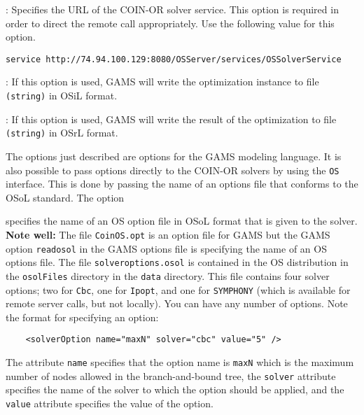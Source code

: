 \vskip 8pt
: Specifies the URL of  the COIN-OR solver service. 
This option is required in order to direct the remote call appropriately.
\vskip 8pt
Use the following value for this option.
\begin{verbatim}
service http://74.94.100.129:8080/OSServer/services/OSSolverService
\end{verbatim}


\iffalse
\vskip 8pt
\noindent {\tt solver  (string)}:   Specifies the solver that is used to solve an instance. 
Valid values are {\tt clp},  {\tt cbc}, {\tt glpk}, {\tt ipopt},  and {\tt bonmin}.  
If a solver name is specified that is not recognized, the default solver for the problem type is used.  
The value for the solver option is case insensitive. 
For example, if the file {\tt CoinOS.opt} contains the two lines
\begin{verbatim}
service http://74.94.100.129:8080/OSServer/services/OSSolverService
solver glpk
\end{verbatim}
then executing
\begin{verbatim}
gams.exe eastborne.gms optfile 1
\end{verbatim}
will result in  using {\tt Glpk}  to solve the problem.   
\fi

\vskip 8pt
:  If this option is used, GAMS will write the optimization instance 
to file {\tt (string)} in    OSiL   format.
\vskip 8pt

\vskip 8pt
:  If this option is used, GAMS will write the result of the optimization 
to file {\tt (string)} in OSrL  format.
\vskip 8pt

The options just described are options for the GAMS modeling language.  
It is also possible to pass options directly to the COIN-OR solvers by using the {\tt OS} interface.
This is done by passing the name of an options file that conforms to the  OSoL  standard.  
The option

\vskip 8pt
  specifies the name of an OS option  file in OSoL format that is 
given to the solver.  {\bf Note well:} The file  {\tt CoinOS.opt} is an option  file for GAMS but the GAMS option 
{\tt readosol} in the GAMS options file  is specifying the name of an OS options file. 
\vskip 8pt
The file {\tt solveroptions.osol} is contained in the OS distribution in the {\tt osolFiles} directory   
in the {\tt data} directory. This file contains four solver options; two for {\tt Cbc}, one for {\tt Ipopt},
and one for {\tt SYMPHONY} (which is available for remote server calls, but not locally).  
You can have any number of options. Note the format for specifying an option:
\begin{verbatim}
    <solverOption name="maxN" solver="cbc" value="5" />
\end{verbatim}
The attribute {\tt name} specifies that the option name is {\tt maxN} which is the maximum number of nodes 
allowed in the branch-and-bound tree, the {\tt solver} attribute specifies the name of the solver to which
the option should be applied, and the {\tt value} attribute specifies the value of the option. 

